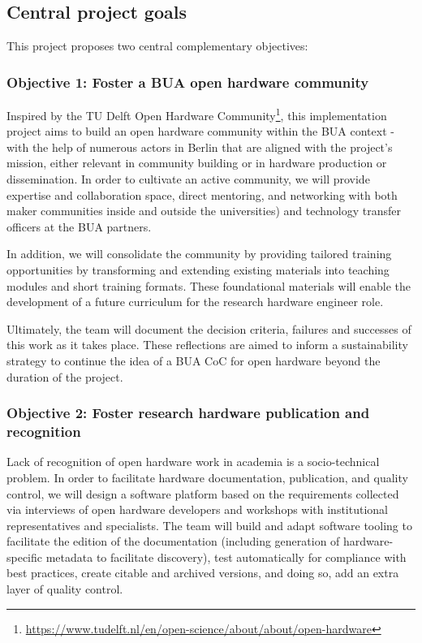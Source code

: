 \documentclass[
  12pt,
  a4paper,
]{article}
\begin{document}
\hypertarget{central-project-goals}{%
\subsection{Central project goals}\label{central-project-goals}}

This project proposes two central complementary objectives:

\hypertarget{objective-1-foster-a-bua-open-hardware-community}{%
\subsubsection{Objective 1: Foster a BUA open hardware
community}\label{objective-1-foster-a-bua-open-hardware-community}}

Inspired by the TU Delft Open Hardware Community\footnote{\url{https://www.tudelft.nl/en/open-science/about/about/open-hardware}},
this implementation project aims to build an open hardware community
within the BUA context - with the help of numerous actors in Berlin that
are aligned with the project's mission, either relevant in community
building or in hardware production or dissemination. In order to
cultivate an active community, we will provide expertise and
collaboration space, direct mentoring, and networking with both maker
communities inside and outside the universities) and technology transfer
officers at the BUA partners.

In addition, we will consolidate the community by providing tailored
training opportunities by transforming and extending existing materials
into teaching modules and short training formats. These foundational
materials will enable the development of a future curriculum for the
research hardware engineer role.

Ultimately, the team will document the decision criteria, failures and
successes of this work as it takes place. These reflections are aimed to
inform a sustainability strategy to continue the idea of a BUA CoC for
open hardware beyond the duration of the project.

\hypertarget{objective-2-foster-research-hardware-publication-and-recognition}{%
\subsubsection{Objective 2: Foster research hardware publication and
recognition}\label{objective-2-foster-research-hardware-publication-and-recognition}}

Lack of recognition of open hardware work in academia is a
socio-technical problem. In order to facilitate hardware documentation,
publication, and quality control, we will design a software platform
based on the requirements collected via interviews of open hardware
developers and workshops with institutional representatives and
specialists. The team will build and adapt software tooling to
facilitate the edition of the documentation (including generation of
hardware-specific metadata to facilitate discovery), test automatically
for compliance with best practices, create citable and archived
versions, and doing so, add an extra layer of quality control.
\end{document}
